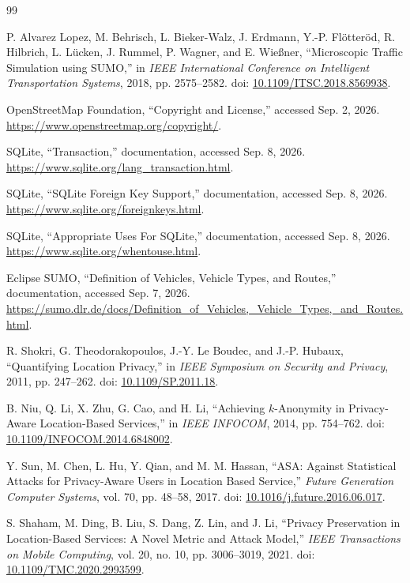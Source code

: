 \documentclass[12pt,a4paper,oneside]{report}
\begin{document}
\clearpage
{}
\begin{thebibliography}{99}
\RaggedRight

P. Alvarez Lopez, M. Behrisch, L. Bieker-Walz, J. Erdmann,
Y.-P. Flötteröd, R. Hilbrich, L. Lücken, J. Rummel,
P. Wagner, and E. Wießner,
``Microscopic Traffic Simulation using SUMO,''
in \emph{IEEE International Conference on Intelligent Transportation Systems},
2018, pp. 2575--2582.
doi: \href{https://doi.org/10.1109/ITSC.2018.8569938}{10.1109/ITSC.2018.8569938}.

OpenStreetMap Foundation,
``Copyright and License,'' accessed Sep. 2, 2026.
\url{https://www.openstreetmap.org/copyright/}.

SQLite, ``Transaction,'' documentation, accessed Sep. 8, 2026.
\url{https://www.sqlite.org/lang_transaction.html}.

SQLite, ``SQLite Foreign Key Support,'' documentation, accessed Sep. 8, 2026.
\url{https://www.sqlite.org/foreignkeys.html}.

SQLite, ``Appropriate Uses For SQLite,'' documentation, accessed Sep. 8, 2026.
\url{https://www.sqlite.org/whentouse.html}.

Eclipse SUMO, ``Definition of Vehicles, Vehicle Types, and Routes,''
documentation, accessed Sep. 7, 2026.
\url{https://sumo.dlr.de/docs/Definition_of_Vehicles,_Vehicle_Types,_and_Routes.html}.

R. Shokri, G. Theodorakopoulos, J.-Y. Le Boudec, and J.-P. Hubaux,
``Quantifying Location Privacy,'' in \emph{IEEE Symposium on Security and Privacy},
2011, pp. 247--262.
doi: \href{https://doi.org/10.1109/SP.2011.18}{10.1109/SP.2011.18}.

B. Niu, Q. Li, X. Zhu, G. Cao, and H. Li,
``Achieving $k$-Anonymity in Privacy-Aware Location-Based Services,''
in \emph{IEEE INFOCOM}, 2014, pp. 754--762.
doi: \href{https://doi.org/10.1109/INFOCOM.2014.6848002}{10.1109/INFOCOM.2014.6848002}.

Y. Sun, M. Chen, L. Hu, Y. Qian, and M. M. Hassan,
``ASA: Against Statistical Attacks for Privacy-Aware Users in Location Based Service,''
\emph{Future Generation Computer Systems}, vol. 70, pp. 48--58, 2017.
doi: \href{https://doi.org/10.1016/j.future.2016.06.017}{10.1016/j.future.2016.06.017}.

S. Shaham, M. Ding, B. Liu, S. Dang, Z. Lin, and J. Li,
``Privacy Preservation in Location-Based Services: A Novel Metric and Attack Model,''
\emph{IEEE Transactions on Mobile Computing}, vol. 20, no. 10,
pp. 3006--3019, 2021.
doi: \href{https://doi.org/10.1109/TMC.2020.2993599}{10.1109/TMC.2020.2993599}.


\end{thebibliography}
\end{document}
